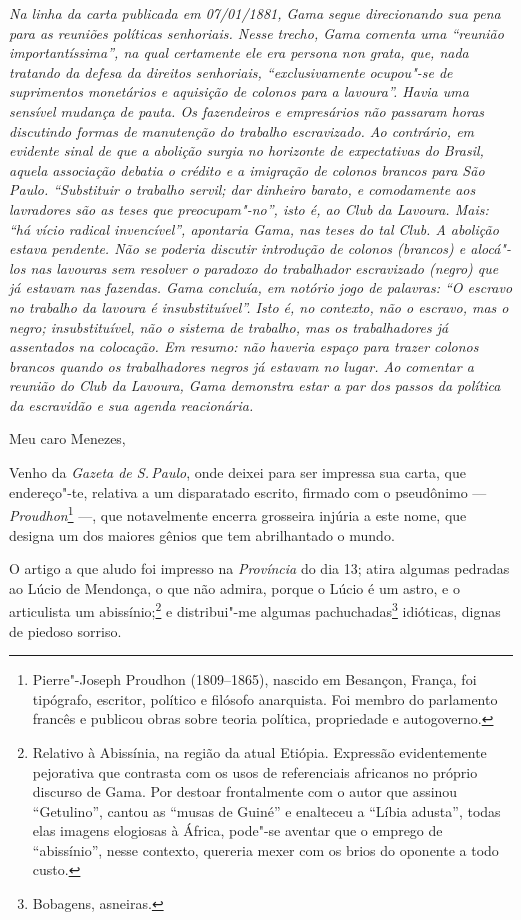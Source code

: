 \begin{flushleft}
{\footnotesize\itshape
Na linha da carta publicada em 07/01/1881, Gama segue direcionando
sua pena para as reuniões políticas senhoriais. Nesse trecho,
Gama comenta uma ``reunião importantíssima'', na qual certamente ele era
\emph{persona non grata}, que, nada tratando da defesa da direitos senhoriais,
``exclusivamente ocupou"-se de suprimentos monetários e aquisição de
colonos para a lavoura''. Havia uma sensível mudança de pauta. Os
fazendeiros e empresários não passaram horas discutindo formas de
manutenção do trabalho escravizado. Ao contrário, em evidente sinal de
que a abolição surgia no horizonte de expectativas do Brasil, aquela
associação debatia o crédito e
a imigração de colonos brancos para São Paulo. ``Substituir o trabalho
servil; dar dinheiro barato, e comodamente aos lavradores são as teses
que preocupam"-no'', isto é, ao Club da Lavoura. Mais: ``há vício radical
invencível'', apontaria Gama, nas teses do tal Club. A abolição estava
pendente. Não se poderia discutir introdução de colonos (brancos) e
alocá"-los nas lavouras sem resolver o paradoxo do trabalhador
escravizado (negro) que já estavam nas fazendas. Gama concluía, em
notório jogo de palavras: ``O escravo no trabalho da lavoura é insubstituível''. Isto é, no
contexto, não o escravo, mas o negro; insubstituível, não o sistema de
trabalho, mas os trabalhadores já assentados na colocação. Em resumo:
não haveria espaço para trazer colonos brancos quando os trabalhadores
negros já estavam no lugar. Ao comentar a reunião do Club da Lavoura,
Gama demonstra estar a par dos passos da política da escravidão e sua
agenda reacionária.}
\end{flushleft}\pagebreak

\noindent{}Meu caro Menezes,\smallskip

Venho da \emph{Gazeta de S.\,Paulo}, onde deixei para ser impressa sua
carta, que endereço"-te, relativa a um disparatado escrito, firmado com o
pseudônimo --- \emph{Proudhon}\footnote{Pierre"-Joseph Proudhon
  (1809--1865), nascido em Besançon, França, foi tipógrafo, escritor,
  político e filósofo anarquista. Foi membro do parlamento francês e
  publicou obras sobre teoria política, propriedade e autogoverno.}
---, que notavelmente encerra grosseira injúria a este nome, que
designa um dos maiores gênios que tem abrilhantado o mundo.

O artigo a que aludo foi impresso na \emph{Província} do dia 13; atira
algumas pedradas ao Lúcio de Mendonça, o que não admira, porque o Lúcio
é um astro, e o articulista um abissínio;\footnote{Relativo à
  Abissínia, na região da atual Etiópia. Expressão evidentemente
  pejorativa que contrasta com os usos de referenciais africanos no
  próprio discurso de Gama. Por destoar frontalmente com o autor que
  assinou ``Getulino'', cantou as ``musas de Guiné'' e enalteceu a ``Líbia
  adusta'', todas elas imagens elogiosas à África, pode"-se aventar que o
  emprego de ``abissínio'', nesse contexto, quereria mexer com os brios do
  oponente a todo custo.} e distribui"-me algumas pachuchadas\footnote{
  Bobagens, asneiras.} idióticas, dignas de piedoso sorriso.

